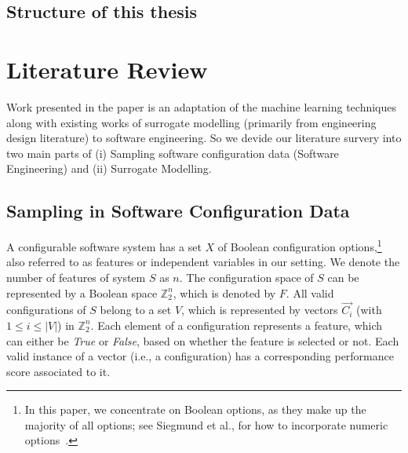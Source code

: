 \documentclass{newsig}
\begin{document}
 
\subsection{Structure of this thesis}


\section{Literature Review}
Work presented in the paper is an adaptation of the machine learning techniques along with existing works of surrogate modelling (primarily from engineering design literature) to software engineering. So we devide our literature survery into two main parts of (i) Sampling software configuration data (Software Engineering) and (ii) Surrogate Modelling. 

\subsection{Sampling in Software Configuration Data}
A configurable software system has a set $X$ of Boolean configuration options,\footnote{In this paper, we concentrate on Boolean options, as they make up the majority of all options; see Siegmund et al., for how to incorporate numeric options~\cite{SGA+15}.} also referred to as features or independent variables in our setting.
We denote the number of features of system $S$ as $n$. The configuration space of $S$ can be represented by a Boolean space $\mathbb{Z}_{2}^{n}$, which is denoted by $F$. All valid configurations of $S$ belong to a set $V$, which is represented by vectors $\vec{C_i}$ (with $1\leq i\leq \left\vert{V}\right\vert$) in $\mathbb{Z}_{2}^{n}$. Each element of a configuration represents a feature, which can either be \emph{True} or \emph{False}, based on whether the feature is selected or not. 
Each valid instance of a vector (i.e., a configuration) has a corresponding performance score associated to it. 
\end{document}
